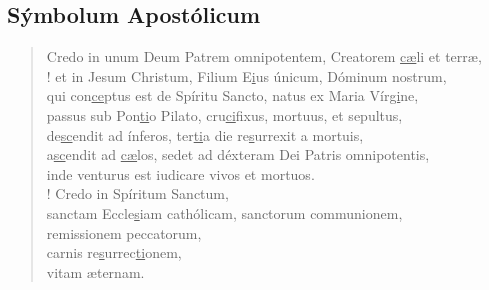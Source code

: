 \subsection*{S\'ymbolum Apost\'olicum}

\begin{verse}
        Credo in unum Deum
            Patrem omnipotentem,
            Creatorem \ul{cæ}li et terræ,
%
\\!     et in Jesum Christum,
            Filium E\ul{i}us \'unicum,
            D\'ominum nostrum,
\\      qui con\ul{ce}ptus est de Sp\'iritu Sancto,
            natus ex Maria V\'ir\ul{gi}ne,
\\      passus sub Pon\ul{ti}o Pilato,
            cru\ul{ci}fixus, mortuus, et sepultus,
\\      de\ul{sc}endit ad \'inferos,
            ter\ul{ti}a die re\ul{s}urrexit a mortuis,
\\      a\ul{sc}endit ad \ul{cæ}los,
            sedet ad d\'exteram Dei Patris omnipotentis,
\\      inde venturus est iudicare
            vivos et mortuos.
%
\\!     Credo in Sp\'iritum Sanctum,
\\      sanctam Eccle\ul{s}iam cath\'olicam,
            sanctorum communionem,
\\      remissionem peccatorum,
\\      carnis re\ul{s}urrec\ul{ti}onem,
\\      vitam æternam.
\end{verse}